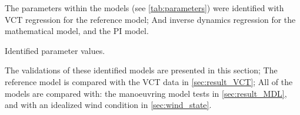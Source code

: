 The parameters within the models (see \autoref{tab:parameters}) were identified with VCT regression for the reference model; And inverse dynamics regression for the mathematical model, and the PI model. 
\begin{table}[h]
    \centering
    \caption{Identified parameter values.}
    \label{tab:parameters}
\end{table}

The validations of these identified models are presented in this section; The reference model is compared with the VCT data in \autoref{sec:result_VCT}; All of the models are compared with: the manoeuvring model tests in \autoref{sec:result_MDL}, and with an idealized wind condition in \autoref{sec:wind_state}.